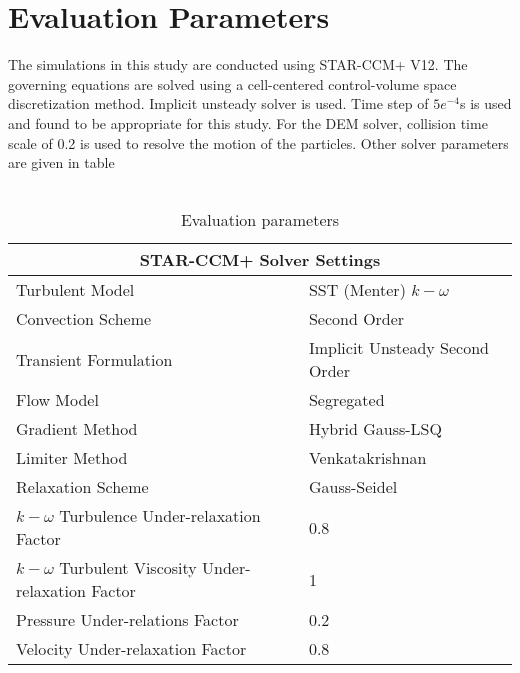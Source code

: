 \section{Evaluation Parameters}
The simulations in this study are conducted using STAR-CCM+ V12. The governing equations  are solved using a cell-centered control-volume space discretization method. Implicit unsteady solver is used. Time step of $5e^{-4}$s is used and found to be appropriate for this study. For the DEM solver, collision time scale of 0.2 is used to resolve the motion  of the particles. Other solver parameters are given in table\\ \\ 
\begin{table}
\caption{Evaluation parameters}
\begin{tabular}{ |p{9cm}|p{7cm}|}
 \hline
 \multicolumn{2}{|c|}{STAR-CCM+ Solver Settings} \\
 \hline
 Turbulent Model& SST (Menter) $k-\omega$\\
 Convection Scheme & Second Order\\
 Transient Formulation & Implicit Unsteady Second Order\\
 Flow Model   & Segregated\\
 Gradient Method & Hybrid Gauss-LSQ\\
 Limiter Method & Venkatakrishnan \\
 Relaxation Scheme & Gauss-Seidel\\
 $k-\omega$ Turbulence Under-relaxation Factor & 0.8\\
 $k-\omega$ Turbulent Viscosity Under-relaxation Factor & 1\\
 Pressure Under-relations Factor & 0.2\\
 Velocity Under-relaxation Factor & 0.8\\
 \hline
\end{tabular}
\end{table}



